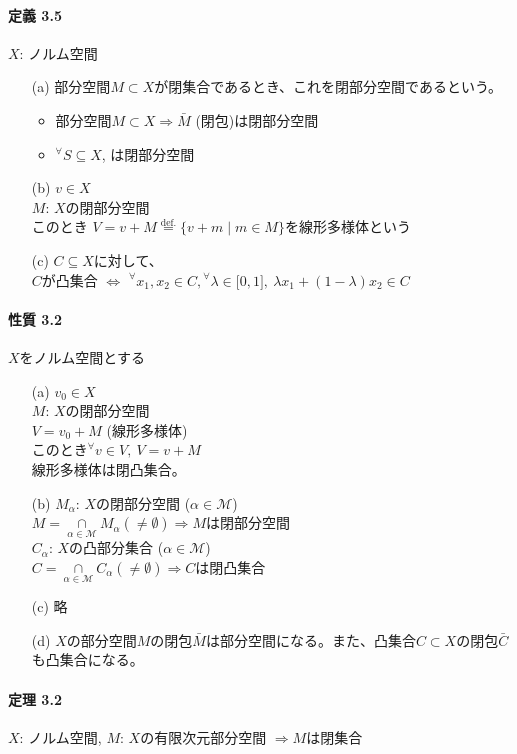 \documentclass[12pt,a4paper]{article}
\begin{document}
    \paragraph{定義 3.5}
      $X$: ノルム空間
      \begin{itemize}
        \item[(a)] 部分空間$M \subset X$が閉集合であるとき、これを閉部分空間であるという。
          \begin{itemize}
            \item 部分空間$M \subset X \Rightarrow \bar{M}$ (閉包)は閉部分空間 
            \item ${}^\forall S \subseteq X$, は閉部分空間
          \end{itemize}
        \item[(b)] $v \in X$ \\ $M$: $X$の閉部分空間 \\ このとき $V = v + M \overset{\text{def.}}{=} \lbrace v + m \mid m \in M  \rbrace$を線形多様体という
        \item[(c)] $C \subseteq X$に対して、\\ $C$が凸集合 $\Leftrightarrow$ ${}^\forall x_1, x_2 \in C, {}^\forall \lambda \in \lbrack 0, 1\rbrack, \ \lambda x_1 + (1 - \lambda) x_2 \in C$
      \end{itemize}

    \paragraph{性質 3.2}
      $X$をノルム空間とする
      \begin{itemize}
        \item[(a)] $v_0 \in X$ \\ $M$: $X$の閉部分空間 \\ $V = v_0 + M$ (線形多様体) \\ このとき${}^\forall v \in V, \ V = v + M$ \\ 線形多様体は閉凸集合。
        \item[(b)] $M_\alpha$: $X$の閉部分空間 ($\alpha \in \mathcal{M}$) \\ $M = \underset{\alpha \in \mathcal{M}}{\cap} M_\alpha (\neq \emptyset) \Rightarrow M$は閉部分空間 \\
                   $C_\alpha$: $X$の凸部分集合 ($\alpha \in \mathcal{M}$) \\ $C = \underset{\alpha \in \mathcal{M}}{\cap} C_\alpha (\neq \emptyset) \Rightarrow C$は閉凸集合 \\
        \item[(c)] 略
        \item[(d)] $X$の部分空間$M$の閉包$\bar{M}$は部分空間になる。また、凸集合$C \subset X$の閉包$\bar{C}$も凸集合になる。
      \end{itemize}
    \paragraph{定理 3.2}
      $X$: ノルム空間, $M$: $X$の有限次元部分空間 $\Rightarrow M$は閉集合
\end{document}
